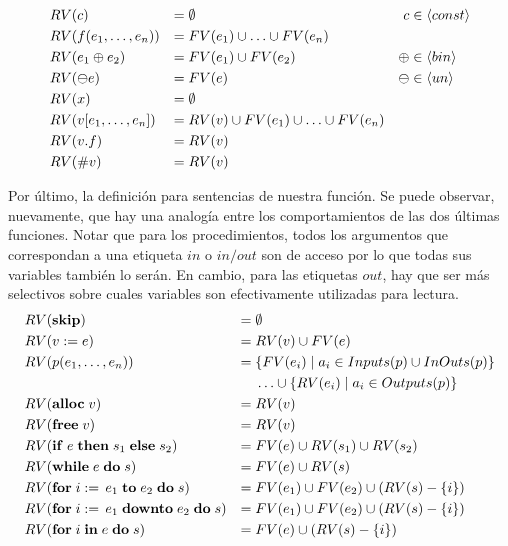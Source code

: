 \documentclass{article}
\begin{document}

\begin{align*}
&RV(c)
&=&\;
\emptyset
&c &\in \langle const \rangle
\\
&RV(f(e_1, \ldots, e_n))
&=&\;
FV(e_1) \cup \ldots \cup FV(e_n)
\\
&RV(e_1 \oplus e_2)
&=&\;
FV(e_1) \cup FV(e_2)
&\oplus &\in \langle bin \rangle
\\
&RV(\ominus e)
&=&\;
FV(e)
&\ominus &\in \langle un \rangle
\\
&RV(x)
&=&\;
\emptyset
\\
&RV(v [e_1, \ldots, e_n])
&=&\;
RV(v) \cup FV(e_1) \cup \ldots \cup FV(e_n)
\\
&RV(v.f)
&=&\;
RV(v)
\\
&RV(\# v)
&=&\;
RV(v)
\end{align*}

Por último, la definición para sentencias de nuestra función.
Se puede observar, nuevamente, que hay una analogía entre los comportamientos de las dos últimas funciones.
Notar que para los procedimientos, todos los argumentos que correspondan a una etiqueta $in$ o $in/out$ son de acceso por lo que todas sus variables también lo serán.
En cambio, para las etiquetas $out$, hay que ser más selectivos sobre cuales variables son efectivamente utilizadas para lectura.
\begin{align*}
&RV(\mathbf{skip})
&=&\;
\emptyset
\\
&RV(v := e)
&=&\;
RV(v) \cup FV(e)
\\
&RV(p(e_1, \ldots, e_n))
&=&\;
\{ FV(e_i) \mid a_i \in Inputs(p) \cup InOuts(p) \}
\\
&&&
\;\ldots\cup
\{ RV(e_i) \mid a_i \in Outputs(p) \}
\\
&RV(\mathbf{alloc} \; v)
&=&\;
RV(v)
\\
&RV(\mathbf{free} \; v)
&=&\;
RV(v)
\\
&RV(\mathbf{if} \; e \; \mathbf{then} \; s_1 \; \mathbf{else} \; s_2)
&=&\;
FV(e) \cup RV(s_1) \cup RV(s_2)
\\
&RV(\mathbf{while} \; e \; \mathbf{do} \; s)
&=&\;
FV(e) \cup RV(s)
\\
&RV(\mathbf{for} \; i := \, e_1 \; \mathbf{to} \; e_2 \; \mathbf{do} \; s)
&=&\;
FV(e_1) \cup FV(e_2) \cup (RV(s) - \{ i \})
\\
&RV(\mathbf{for} \; i := \, e_1 \; \mathbf{downto} \; e_2 \; \mathbf{do} \; s)
&=&\;
FV(e_1) \cup FV(e_2) \cup (RV(s) - \{ i \})
\\
&RV(\mathbf{for} \; i \; \mathbf{in} \; e \; \mathbf{do} \; s)
&=&\;
FV(e) \cup (RV(s) - \{ i \})
\end{align*}
\end{document}
